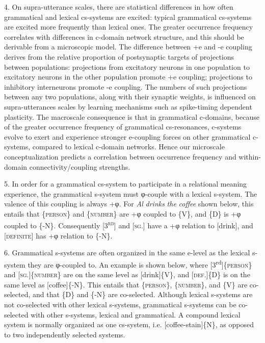 4. On supra-utterance scales, there are statistical differences in how often grammatical and lexical cs-systems are excited: typical grammatical cs-systems are excited more frequently than lexical ones. The greater occurrence frequency correlates with differences in c-domain network structure, and this should be derivable from a microscopic model. The difference between +e and -e coupling derives from the relative proportion of postsynaptic targets of projections between populations: projections from excitatory neurons in one population to excitatory neurons in the other population promote +e coupling; projections to inhibitory interneurons promote -e coupling. The numbers of such projections between any two populations, along with their synaptic weights, is influenced on supra-utterances scales by learning mechanisms such as spike-timing dependent plasticity. The macroscale consequence is that in grammatical c-domains, because of the greater occurrence frequency of grammatical cs-resonances, c-systems evolve to exert and experience stronger e-coupling forces on other grammatical c-systems, compared to lexical c-domain networks. Hence our microscale conceptualization predicts a correlation between occurrence frequency and within-domain connectivity/coupling strengths.

5. In order for a grammatical cs-system to participate in a relational meaning experience, the grammatical s-system must φ-couple with a lexical s-system. The valence of this coupling is always +φ. For \textit{Al} \textit{drinks} \textit{the} \textit{coffee} shown below, this entails that \{\textsc{person}\} and \{\textsc{number}\} are +φ coupled to \{V\}, and \{D\} is +φ coupled to \{-N\}. Consequently [\textsc{3}\textsc{\textsuperscript{rd}}] and [\textsc{sg}.] have a +φ relation to [drink], and [\textsc{definite}] has +φ relation to \{-N\}.

6. Grammatical s-systems are often organized in the same e-level as the lexical s-system they are φ-coupled to. An example is shown below, where [3\textsuperscript{rd}]\{\textsc{person}\} and [\textsc{sg.}]\{\textsc{number}\} are on the same level as [drink]\{V\}, and [\textsc{def}.]\{D\} is on the same level as [coffee]\{-N\}. This entails that \{\textsc{person}\}, \{\textsc{number}\}, and \{V\} are co-selected, and that \{D\} and \{-N\} are co-selected. Although lexical s-systems are not co-selected with other lexical s-systems, grammatical s-systems can be co-selected with other s-systems, lexical and grammatical. A compound lexical system is normally organized as one cs-system, i.e. [coffee-stain]\{N\}, as opposed to two independently selected systems.

